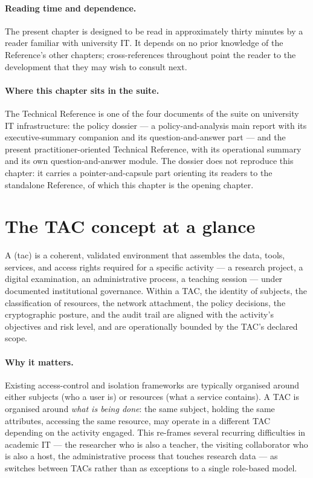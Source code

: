 \paragraph{Reading time and dependence.} The present chapter is
designed to be read in approximately thirty minutes by a reader
familiar with university IT. It depends on no prior knowledge
of the Reference's other chapters; cross-references throughout
point the reader to the development that they may wish to
consult next.

\paragraph{Where this chapter sits in the suite.} The Technical
Reference is one of the four documents of the suite on university
IT infrastructure: the policy dossier --- a policy-and-analysis
main report with its executive-summary companion and its
question-and-answer part --- and the present
practitioner-oriented Technical Reference, with its operational
summary and its own question-and-answer module. The dossier does
not reproduce this chapter: it carries a pointer-and-capsule part
orienting its readers to the standalone Reference, of which this
chapter is the opening chapter.

\section{The TAC concept at a glance}
\label{sec:synth-tac}

A  (\gls{tac}) is a coherent,
validated environment that assembles the data, tools, services,
and access rights required for a specific activity --- a research
project, a digital examination, an administrative process, a
teaching session --- under documented institutional governance.
Within a TAC, the identity of subjects, the classification of
resources, the network attachment, the policy decisions, the
cryptographic posture, and the audit trail are aligned with the
activity's objectives and risk level, and are operationally
bounded by the TAC's declared scope.

\paragraph{Why it matters.} Existing access-control and isolation
frameworks are typically organised around either subjects (who a
user is) or resources (what a service contains). A TAC is
organised around \emph{what is being done}: the same subject,
holding the same attributes, accessing the same resource, may
operate in a different TAC depending on the activity engaged.
This re-frames several recurring difficulties in academic IT ---
the researcher who is also a teacher, the visiting collaborator
who is also a host, the administrative process that touches
research data --- as switches between TACs rather than as
exceptions to a single role-based model.

